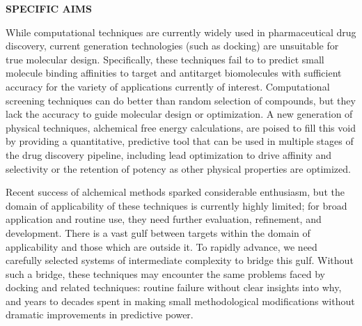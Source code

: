 \documentclass[11pt]{article}
\begin{document}





\noindent \begin{center}
{\bf SPECIFIC AIMS}
\end{center}

While computational techniques are currently widely used in pharmaceutical drug discovery, current generation technologies (such as docking) are unsuitable for true molecular design. 
Specifically, these techniques fail to to predict small molecule binding affinities to target and antitarget biomolecules with sufficient accuracy for the variety of applications currently of interest. 
Computational screening techniques can do better than random selection of compounds, but they lack the accuracy to guide molecular design or optimization. 
A new generation of physical techniques, alchemical free energy calculations, are poised to fill this void by providing a quantitative, predictive tool that can be used in multiple stages of the drug discovery pipeline, including lead optimization to drive affinity and selectivity or the retention of potency as other physical properties are optimized. 

Recent success of alchemical methods sparked considerable enthusiasm, but the domain of applicability of these techniques is currently highly limited; for broad application and routine use, they need further evaluation, refinement, and development. 
There is a vast gulf between targets within the domain of applicability and those which are outside it. 
To rapidly advance, we need carefully selected systems of intermediate complexity to bridge this gulf. 
Without such a bridge, these techniques may encounter the same problems faced by docking and related techniques: routine failure without clear insights into why, and years to decades spent in making small methodological modifications without dramatic improvements in predictive power.
\end{document}
